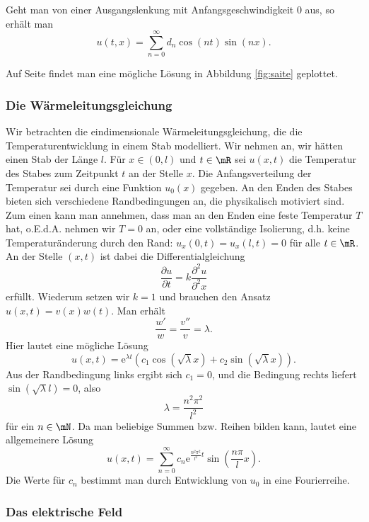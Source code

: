 \documentclass[%
11pt,%
twoside,%
titlepage,%
german,%
headsepline%
]{scrartcl}
\begin{document}
\begin{ueb}
Geht man von einer Ausgangslenkung mit Anfangsgeschwindigkeit $0$ aus, so erh\"alt man
$$u(t,x)=\sum_{n=0}^\infty d_n\cos(nt)\sin(nx).$$
\end{ueb}

Auf Seite \pageref{fig:saite} findet man eine mögliche Lösung in Abbildung \ref{fig:saite} geplottet.

\subsubsection{Die W\"armeleitungsgleichung}

Wir betrachten die eindimensionale W\"arme\-lei\-tungs\-gleichung, die die Temperaturentwicklung in einem Stab modelliert. Wir nehmen an, wir h\"atten einen Stab der L\"ange $l$. F\"ur $x\in(0,l)$ und $t\in\mR$ sei $u(x,t)$ die Temperatur des Stabes zum Zeitpunkt $t$ an der Stelle $x$. Die Anfangsverteilung der Temperatur sei durch eine Funktion $u_0(x)$ gegeben. An den Enden des Stabes bieten sich verschiedene Randbedingungen an, die physikalisch motiviert sind. Zum einen kann man annehmen, dass man an den Enden eine feste Temperatur $T$ hat, o.E.d.A. nehmen wir $T=0$
an, oder eine vollst\"andige Isolierung, d.h. keine Temperatur\"anderung durch den Rand: $u_x(0,t)=u_x(l,t)=0$ f\"ur alle $t\in\mR$. An der
Stelle $(x,t)$ ist dabei die Differentialgleichung
$$\frac{\partial u}{\partial t}=k\frac{\partial^2 u}{\partial^2 x}$$
erf\"ullt. Wiederum setzen wir $k=1$ und brauchen den Ansatz $u(x,t)=v(x)w(t)$. Man erh\"alt
$$\frac{w'}{w}=\frac{v''}{v}=\lambda.$$
Hier lautet eine m\"ogliche L\"osung
$$u(x,t)=\mathrm{e}^{\lambda t}(c_1\cos(\sqrt{\lambda}x)+c_2\sin(\sqrt{\lambda}x)).$$
Aus der Randbedingung links ergibt sich $c_1=0$, und die Bedingung rechts liefert $\sin(\sqrt{\lambda}l)=0$, also
$$\lambda=\frac{n^2\pi^2}{l^2}$$
f\"ur ein $n\in\mN$. Da man beliebige Summen bzw. Reihen bilden kann, lautet eine allgemeinere L\"osung
$$u(x,t)=\sum_{n=0}^\infty c_n\mathrm{e}^{\frac{n^2\pi^2}{l^2}t}\sin\left(\frac{n\pi}{l}x\right).$$
Die Werte f\"ur $c_n$ bestimmt man durch Entwicklung von $u_0$ in eine Fourierreihe.

\subsubsection{Das elektrische Feld}
\end{document}
